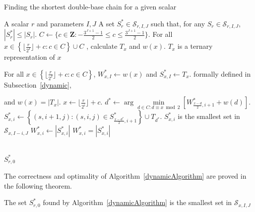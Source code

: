 \begin{algorithm}
	\caption{Finding the shortest double-base chain for a given scalar}
	\begin{algorithmic}
		\Require A scalar $r$ and parameters $I, J$
		\Ensure A set $S_r^* \in \mathcal{S}_{r,I,J}$ such that, for any $S_r \in \mathcal{S}_{r,I,J}$, $|S^*_r| \leq |S_r|$. 
		\Statex
		\State $C \leftarrow \{c \in \mathbf{Z} : -\frac{3^{J + 1} - 1}{2} \leq c \leq  \frac{3^{J + 1} - 1}{2}\}$.
		\State For all $x \in \left\{ \lfloor \frac{r}{2^I} \rfloor + c  : c \in C\right\} \cup C$ , calculate $T_x$ and $w(x)$.
		\Comment $T_x$ is a ternary representation of $x$
		 
		\State For all $x \in \left\{ \lfloor \frac{r}{2^I} \rfloor + c  : c \in C\right\}$, $W_{x,I}^* \leftarrow w(x)$ and $S_{x,I}^* \leftarrow T_x$. 
		\Comment formally defined in Subsection~\ref{dynamic},
				
		 \Comment and $w(x) = |T_x|$.
				\State $x \leftarrow \lfloor \frac{r}{2^i} \rfloor + c$.
				\State $d^* \leftarrow \arg \min\limits_{d \in C : d \equiv x \bmod 2} \left[ W^*_{\frac{x - d}{2}, i + 1 } + w(d) \right]$. 
				\State $S_{x,i}^* \leftarrow \left\{(s,i + 1,j) : (s,i,j) \in S^*_{\frac{x - d^*}{2}, i + 1 } \right\} \cup T_{d^*}$.
				\Comment $S_{x,i}^*$ is the smallest set in $\mathcal{S}_{x, I - i, J}$ 
				\State $W_{x,i}^* \leftarrow |S_{x,i}^*|$
				\Comment $W_{x,i}^* = |S_{x,i}^*|$
			\EndFor
		\EndFor
		
		\\ \Return $S_{r,0}^*$
	\end{algorithmic}
	\label{dynamicAlgorithm}
\end{algorithm}

The correctness and optimality of Algorithm~\ref{dynamicAlgorithm} are proved in the following theorem. 

\begin{theorem}
The set $S^*_{r,0}$ found by Algorithm~\ref{dynamicAlgorithm} is the smallest set in $\mathcal{S}_{x,I,J}$
\end{theorem}

